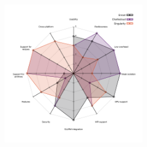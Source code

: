 \documentclass[hyperref={pdfpagelabels=false},aspectratio=169]{beamer}
\begin{document}
    \begin{frame}
      \begin{figure}[H]
      \centering
      \includegraphics[width=0.55\textwidth]{images/containers_spider.pdf}
    \end{figure}
    \end{frame}
\end{document}
